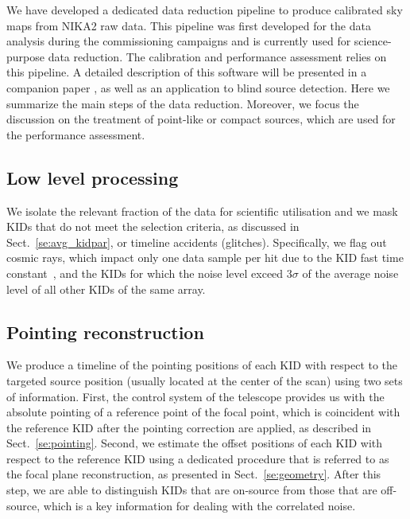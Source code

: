 \documentclass[traditionalabstract]{aa}
\newcommand{\lp}[1]{#1}
\begin{document}
We have developed a dedicated data reduction pipeline to
produce calibrated sky maps from NIKA2 raw data. This pipeline was first 
developed for the data analysis during the commissioning campaigns and
is currently used for science-purpose data reduction. The calibration
and performance assessment relies on this pipeline. 
A detailed description of this software will be presented in a companion
paper \citep{Ponthieu2019}, as well as an application to blind source
detection. Here we summarize the main steps of the data
reduction. {\lp Moreover, we focus the discussion on the treatment of
point-like or compact sources, which are used for the
performance assessment.}

\subsection{Low level processing}
\label{se:ll_proc}
We isolate the relevant fraction of the data for scientific
utilisation and {\lp we mask KIDs that do not meet the selection criteria, as
discussed in Sect.~\ref{se:avg_kidpar},} or
timeline accidents (glitches). Specifically, we flag out cosmic rays,
which impact only one data sample per hit due to the KID fast time
constant~\citep{Catalano2014},
and the KIDs for which the noise level exceed $3\sigma$ of the average
noise level of all other KIDs of the same array.  

\subsection{Pointing reconstruction}
\label{se:ptg}
We produce a timeline of the pointing positions of each KID with
respect to the targeted source position (usually located at the center of the
scan) using two sets of information. First, the control system of the
telescope provides us with the absolute pointing of a reference point
of the focal point, which is coincident with the reference KID after
the pointing correction are applied, as described in
Sect.~\ref{se:pointing}. Second, we estimate the offset positions of
each KID with respect to the reference KID using a dedicated
procedure that is referred to as the focal plane reconstruction, as
presented in Sect.~\ref{se:geometry}. After this step, we are able to
distinguish KIDs that are on-source from those that are off-source,
which is a key information for dealing with the correlated noise. 
  
\end{document}
